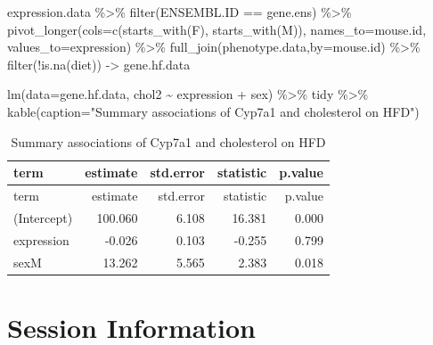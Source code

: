 \documentclass[
]{article}
\newenvironment{Shaded}{\begin{snugshade}}{\end{snugshade}}
\newcommand{\AttributeTok}[1]{\textcolor[rgb]{0.77,0.63,0.00}{#1}}
\newcommand{\FunctionTok}[1]{\textcolor[rgb]{0.00,0.00,0.00}{#1}}
\newcommand{\NormalTok}[1]{#1}
\newcommand{\OtherTok}[1]{\textcolor[rgb]{0.56,0.35,0.01}{#1}}
\newcommand{\SpecialCharTok}[1]{\textcolor[rgb]{0.00,0.00,0.00}{#1}}
\newcommand{\StringTok}[1]{\textcolor[rgb]{0.31,0.60,0.02}{#1}}
\begin{document}
\begin{Shaded}
\begin{Highlighting}[]
\NormalTok{expression.data }\SpecialCharTok{\%\textgreater{}\%}
  \FunctionTok{filter}\NormalTok{(ENSEMBL.ID }\SpecialCharTok{==}\NormalTok{ gene.ens) }\SpecialCharTok{\%\textgreater{}\%}
  \FunctionTok{pivot\_longer}\NormalTok{(}\AttributeTok{cols=}\FunctionTok{c}\NormalTok{(}\FunctionTok{starts\_with}\NormalTok{(}\StringTok{\textquotesingle{}F\textquotesingle{}}\NormalTok{),}
                      \FunctionTok{starts\_with}\NormalTok{(}\StringTok{\textquotesingle{}M\textquotesingle{}}\NormalTok{)),}
               \AttributeTok{names\_to=}\StringTok{\textquotesingle{}mouse.id\textquotesingle{}}\NormalTok{,}
               \AttributeTok{values\_to=}\StringTok{\textquotesingle{}expression\textquotesingle{}}\NormalTok{) }\SpecialCharTok{\%\textgreater{}\%}
  \FunctionTok{full\_join}\NormalTok{(phenotype.data,}\AttributeTok{by=}\StringTok{\textquotesingle{}mouse.id\textquotesingle{}}\NormalTok{) }\SpecialCharTok{\%\textgreater{}\%}
  \FunctionTok{filter}\NormalTok{(}\SpecialCharTok{!}\FunctionTok{is.na}\NormalTok{(diet)) }\OtherTok{{-}\textgreater{}}\NormalTok{ gene.hf.data}

\FunctionTok{lm}\NormalTok{(}\AttributeTok{data=}\NormalTok{gene.hf.data, chol2 }\SpecialCharTok{\textasciitilde{}}\NormalTok{ expression }\SpecialCharTok{+}\NormalTok{ sex) }\SpecialCharTok{\%\textgreater{}\%}
\NormalTok{  tidy }\SpecialCharTok{\%\textgreater{}\%}
  \FunctionTok{kable}\NormalTok{(}\AttributeTok{caption=}\StringTok{"Summary associations of Cyp7a1 and cholesterol on HFD"}\NormalTok{)}
\end{Highlighting}
\end{Shaded}

\begin{longtable}[]{@{}lrrrr@{}}
\caption{Summary associations of Cyp7a1 and cholesterol on
HFD}\tabularnewline
\toprule()
term & estimate & std.error & statistic & p.value \\
\midrule()
\endfirsthead
\toprule()
term & estimate & std.error & statistic & p.value \\
\midrule()
\endhead
(Intercept) & 100.060 & 6.108 & 16.381 & 0.000 \\
expression & -0.026 & 0.103 & -0.255 & 0.799 \\
sexM & 13.262 & 5.565 & 2.383 & 0.018 \\
\bottomrule()
\end{longtable}

\hypertarget{session-information}{%
\section{Session Information}\label{session-information}}
\end{document}
